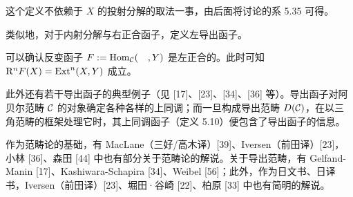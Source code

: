 这个定义不依赖于 $X$ 的投射分解的取法一事，由后面将讨论的系 5.35 可得。

类似地，对于内射分解与右正合函子，定义左导出函子。

可以确认反变函子 $F:=\operatorname{Hom}_{\mathcal{C}}(\quad,Y)$ 是左正合的。此时可知 $\mathrm{R}^nF(X)=\operatorname{Ext}^n(X,Y)$ 成立。

此外还有若干导出函子的典型例子（见 [17]、[23]、[34]、[36] 等）。导出函子对阿贝尔范畴 $\mathcal{C}$ 的对象确定各种各样的上同调；而一旦构成导出范畴 $D(\mathcal{C})$，在以三角范畴的框架处理它时，其上同调函子（定义 5.10）便包含了导出函子的信息。

作为范畴论的基础，有 MacLane（三好/高木译）[39]、Iversen（前田译）[23]，小林 [36]、森田 [44] 中也有部分关于范畴论的解说。关于导出范畴，有 Gelfand-Manin [17]、Kashiwara-Schapira [34]、Weibel [56]；此外，作为日文书、日译书，Iversen（前田译）[23]、堀田·谷崎 [22]、柏原 [33] 中也有简明的解说。
